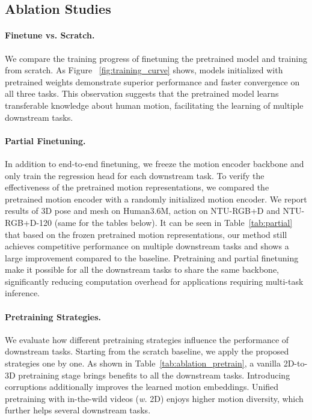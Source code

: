 \subsection{Ablation Studies}
\label{subsec:ablation}


\paragraph{Finetune vs. Scratch.} 
We compare the training progress of finetuning the pretrained model and training from scratch. As Figure ~\ref{fig:training_curve} shows, models initialized with pretrained weights demonstrate superior performance and faster convergence on all three tasks. This observation suggests that the pretrained model learns transferable knowledge about human motion, facilitating the learning of multiple downstream tasks.




\paragraph{Partial Finetuning.} 
In addition to end-to-end finetuning, we freeze the motion encoder backbone and only train the regression head for each downstream task. To verify the effectiveness of the pretrained motion representations, we compared the pretrained motion encoder with a randomly initialized motion encoder. We report results of 3D pose and mesh on Human3.6M, action on NTU-RGB+D and NTU-RGB+D-120 (same for the tables below). It can be seen in Table~\ref{tab:partial} that based on the frozen pretrained motion representations, our method still achieves competitive performance on multiple downstream tasks and shows a large improvement compared to the baseline. Pretraining and partial finetuning make it possible for all the downstream tasks to share the same backbone, significantly reducing computation overhead for applications requiring multi-task inference.





\paragraph{Pretraining Strategies.}
We evaluate how different pretraining strategies influence the performance of downstream tasks. Starting from the scratch baseline, we apply the proposed strategies one by one. As shown in Table~\ref{tab:ablation_pretrain}, a vanilla 2D-to-3D pretraining stage brings benefits to all the downstream tasks. Introducing corruptions additionally improves the learned motion embeddings. Unified pretraining with in-the-wild videos (\emph{w.} 2D) enjoys higher motion diversity, which further helps several downstream tasks.








